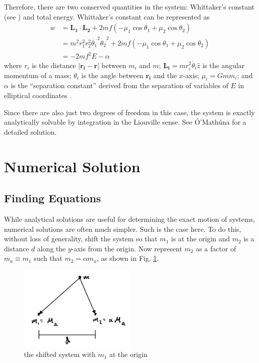 \documentclass[preprint,titlepage,preprintnumbers,amsmath,amssymb,aps,11pt]{revtex4-2}
\begin{document}
Therefore, there are two conserved quantities in the system: Whittaker's constant (see \cite[p. 100]{Krishnaswami2019}) and total energy. Whittaker's constant can be represented as
\begin{equation}
    \begin{aligned}
        w & =\bm{L_1}\cdot\bm{L_2}+2mf(-\mu _1 \cos{\theta _1} +\mu _2 \cos{\theta _2})                           \\
          & =m^2r_1^2r_2^2\dot{\theta _1}^2\dot{\theta _2}^2+2mf(-\mu _1 \cos{\theta _1} +\mu _2 \cos{\theta _2}) \\
          & =-2mf^2E-\alpha
    \end{aligned}
\end{equation}
where $r_i$ is the distance $|\bm{r_i}-\bm{r}|$ between $m_i$ and $m$; $\bm{L_i}=mr_i^2\dot{\theta _i}\hat{z}$ is the angular momentum of a mass; $\theta _i$ is the angle between $\bm{r_i}$ and the $x$-axis; $\mu _i=Gmm_i$; and $\alpha$ is the ``separation constant'' derived from the separation of variables of $E$ in elliptical coordinates \cite[p. 101]{Krishnaswami2019}.

Since there are also just two degrees of freedom in this case, the system is exactly analytically solvable by integration in the Liouville sense. See Ó'Mathúna \cite[pages 49-105 and 113-142]{OMathuna2008} for a detailed solution.

\section{Numerical Solution}\label{sec:numerical}

\subsection{Finding Equations}\label{sec:equations}
While analytical solutions are useful for determining the exact motion of systems, numerical solutions are often much simpler. Such is the case here.
To do this, without loss of generality, shift the system so that $m_1$ is at the origin and $m_2$ is a distance $d$ along the $y$-axis from the origin. Now represent $m_2$ as a factor of $m_a\equiv m_1$ such that $m_2=\alpha m_a$, as shown in Fig. \ref{fig:shiftedsys}.
\begin{figure}
    \centering
    \includegraphics[width=0.5\textwidth]{Fig 3.jpeg}
    \caption{the shifted system with $m_1$ at the origin}
    \label{fig:shiftedsys}
\end{figure}
\end{document}
